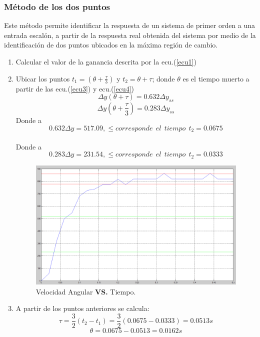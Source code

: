 \documentclass[twocolumn]{IEEEtran}
\begin{document}
\subsubsection{Método de los  dos puntos}
\noindent
Este método permite identificar la respuesta de un sistema de primer orden a una entrada escalón, a partir de la respuesta real obtenida del sistema por medio de la identificación de dos puntos ubicados en la máxima región de cambio.
\begin{enumerate}
 \item Calcular el valor de la ganancia descrita por la ecu.(\ref{ecu1})
 \item Ubicar los puntos $t_1=(\theta+\frac{\tau}{3})$ y $t_2=\theta+\tau$; donde $\theta$ es el tiempo muerto a partir de las ecu.(\ref{ecu3}) y ecu.(\ref{ecu4})
\begin{equation}
 \Delta y(\theta+ \tau)=0.632\Delta y_{ss}
\label{ecu3}
\end{equation}
\begin{equation}
 \Delta y(\theta +\frac{\tau}{3})=0.283\Delta y_{ss}
\label{ecu4}
\end{equation}
\noindent
Donde a $$0.632\Delta y=517.09,\leq corresponde\ \ el \ \ tiempo\ \ t_2=0.0675$$\\
Donde a $$0.283\Delta y=231.54,\leq corresponde\ \ el \ \ tiempo\ \ t_2=0.0333$$
\begin{figure}[H]
	\centering
		\includegraphics[scale=0.17]{figure3.png}
	\caption{Velocidad Angular \textbf{VS.} Tiempo.}
	\label{fig3}
\end{figure}
 \item A partir de los puntos anteriores se calcula:
\begin{equation}
 \tau=\frac{3}{2}(t_2-t_1)=\frac{3}{2}(0.0675-0.0333)=0.0513s
\label{ecu5}
\end{equation}
$$\theta =0.0675-0.0513=0.0162s$$
\end{enumerate}
\end{document}
